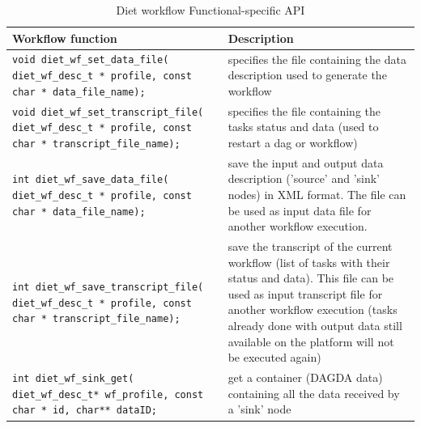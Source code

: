 \begin{itemize}
\begin{table}[htbp]
  \centering
   \begin{tabular}[htbp]{|p{8cm}|p{7.5cm}|}\hline
    Workflow function & Description \\\hline
    \texttt{void  \newline
      diet\_wf\_set\_data\_file( \newline
        diet\_wf\_desc\_t * profile, \newline
        const char * data\_file\_name);}
    &
    specifies the file containing the data description used to generate the workflow
    \\\hline
    \texttt{void  \newline
      diet\_wf\_set\_transcript\_file(  \newline
        diet\_wf\_desc\_t * profile,  \newline
        const char * transcript\_file\_name);}
    &
    specifies the file containing the tasks status and data (used to restart a dag or workflow)
    \\\hline
    \texttt{int \newline
      diet\_wf\_save\_data\_file(  \newline
        diet\_wf\_desc\_t * profile,  \newline
        const char * data\_file\_name);}
    &
    save the input and output data description ('source' and 'sink' nodes) in XML format.
    The file can be used as input data file for another workflow execution.
    \\\hline
    \texttt{int \newline
      diet\_wf\_save\_transcript\_file( \newline
        diet\_wf\_desc\_t * profile,  \newline
        const char * transcript\_file\_name);}
    &
    save the transcript of the current workflow (list of tasks with their status and data).
    This file can be used as input transcript file for another workflow execution (tasks already done
    with output data still available on the platform will not be executed again)
    \\\hline
    \texttt{int \newline
      diet\_wf\_sink\_get(  \newline
        diet\_wf\_desc\_t* wf\_profile, \newline
        const char * id, char** dataID;}
    &
    get a container (DAGDA data) containing all the data received by a 'sink' node
    \\\hline
    \end{tabular}
    \caption{Diet workflow Functional-specific API}
\label{tab::wf_gw_api}
\end{table}



\end{itemize}
